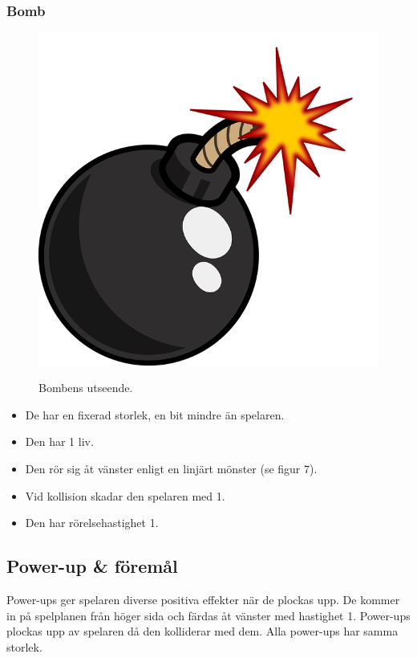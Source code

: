 \documentclass{TDP005mall}
\begin{document}
\subsubsection*{Bomb}
\begin{figure}[h!]
  \centering
  \includegraphics[scale=0.08]{Images/Bomb.png}
  \label{}
  \caption{Bombens utseende.}
\end{figure}

\begin{itemize}
\item De har en fixerad storlek, en bit mindre än spelaren.
\item Den har 1 liv.
\item Den rör sig åt vänster enligt en linjärt mönster (se figur 7).
\item Vid kollision skadar den spelaren med 1.
\item Den har rörelsehastighet 1.

\end{itemize}



\subsection{Power-up \& föremål}
Power-ups ger spelaren diverse positiva effekter när de plockas upp. De kommer in på spelplanen från höger sida och färdas åt vänster med hastighet 1. 
Power-ups plockas upp av spelaren då den kolliderar med dem. Alla power-ups har samma storlek.
\end{document}
